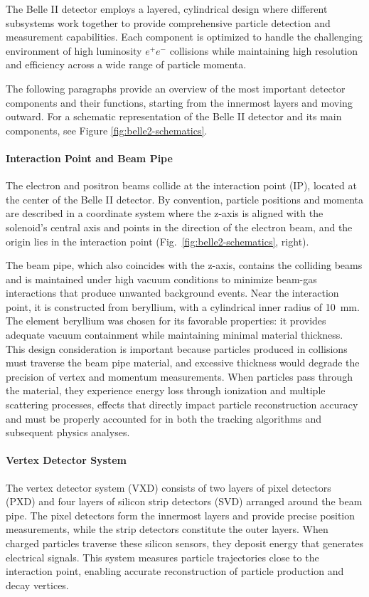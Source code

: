 The Belle II detector employs a layered, cylindrical design where different subsystems work together to provide comprehensive particle detection and measurement capabilities.
Each component is optimized to handle the challenging environment of high luminosity $e^+e^-$ collisions while maintaining high resolution and efficiency across a wide range of particle momenta.

The following paragraphs provide an overview of the most important detector components and their functions, starting from the innermost layers and moving outward.
For a schematic representation of the Belle II detector and its main components, see Figure \ref{fig:belle2-schematics}.

\paragraph{Interaction Point and Beam Pipe}
The electron and positron beams collide at the interaction point (IP), located at the center of the Belle II detector.
By convention, particle positions and momenta are described in a coordinate system where the z-axis is aligned with the solenoid's central axis and points in the direction of the electron beam, and the origin lies in the interaction point (Fig.\ \ref{fig:belle2-schematics}, right).

The beam pipe, which also coincides with the z-axis, contains the colliding beams and is maintained under high vacuum conditions to minimize beam-gas interactions that produce unwanted background events.
Near the interaction point, it is constructed from beryllium, with a cylindrical inner radius of \qty{10}{\milli\meter}.
The element beryllium was chosen for its favorable properties: it provides adequate vacuum containment while maintaining minimal material thickness.
This design consideration is important because particles produced in collisions must traverse the beam pipe material, and excessive thickness would degrade the precision of vertex and momentum measurements.
When particles pass through the material, they experience energy loss through ionization and multiple scattering processes, effects that directly impact particle reconstruction accuracy and must be properly accounted for in both the tracking algorithms and subsequent physics analyses.

\paragraph{Vertex Detector System}
The vertex detector system (VXD) consists of two layers of pixel detectors (PXD) and four layers of silicon strip detectors (SVD) arranged around the beam pipe.
The pixel detectors form the innermost layers and provide precise position measurements, while the strip detectors constitute the outer layers.
When charged particles traverse these silicon sensors, they deposit energy that generates electrical signals.
This system measures particle trajectories close to the interaction point, enabling accurate reconstruction of particle production and decay vertices.

